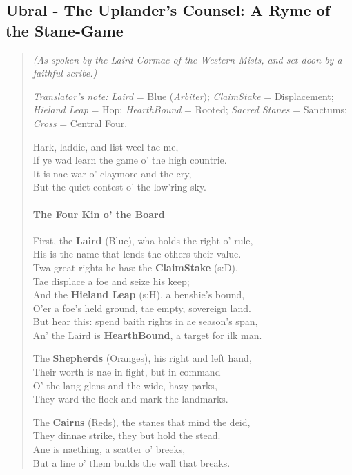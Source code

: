 \documentclass[11pt]{article}
\begin{document}
\subsection{Ubral - The Uplander's Counsel: A Ryme of the Stane-Game}
\begin{quote}\small\itshape
\textit{(As spoken by the Laird Cormac of the Western Mists, and set doon by a faithful scribe.)}

\medskip
\textit{Translator's note:} \emph{Laird} = Blue (\emph{Arbiter}); \emph{Claim\textendash Stake} = Displacement; \emph{Hieland Leap} = Hop; \emph{Hearth\textendash Bound} = Rooted; \emph{Sacred Stanes} = Sanctums; \emph{Cross} = Central Four.

\medskip
Hark, laddie, and list weel tae me,\\
If ye wad learn the game o' the high countrie.\\
It is nae war o' claymore and the cry,\\
But the quiet contest o' the low'ring sky.

\paragraph{The Four Kin o' the Board}
First, the \textbf{Laird} (Blue), wha holds the right o' rule,\\
His is the name that lends the others their value.\\
Twa great rights he has: the \textbf{Claim\textendash Stake} (s{:}D),\\
Tae displace a foe and seize his keep;\\
And the \textbf{Hieland Leap} (s{:}H), a benshie's bound,\\
O'er a foe's held ground, tae empty, sovereign land.\\
But hear this: spend baith rights in ae season's span,\\
An' the Laird is \textbf{Hearth\textendash Bound}, a target for ilk man.

The \textbf{Shepherds} (Oranges), his right and left hand,\\
Their worth is nae in fight, but in command\\
O' the lang glens and the wide, hazy parks,\\
They ward the flock and mark the landmarks.

The \textbf{Cairns} (Reds), the stanes that mind the deid,\\
They dinnae strike, they but hold the stead.\\
Ane is naething, a scatter o' breeks,\\
But a line o' them builds the wall that breaks.


\end{quote}
\end{document}
